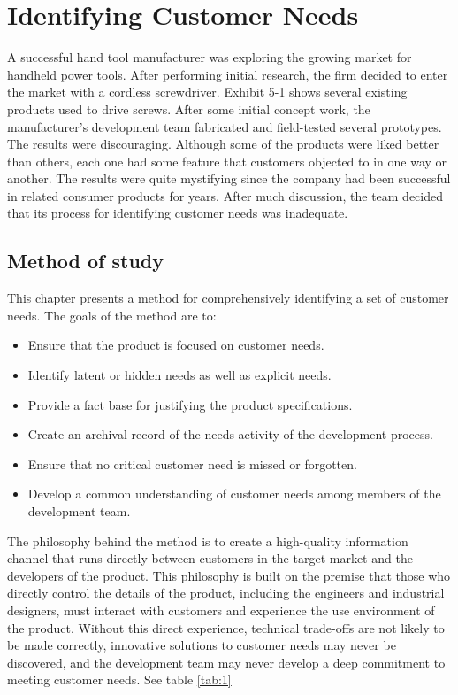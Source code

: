 
\chapter{Identifying Customer Needs}

A successful hand tool manufacturer was exploring the growing market for handheld power tools. After performing initial research, the firm decided to enter the market with a cordless screwdriver. Exhibit 5-1 shows several existing products used to drive screws. After some initial concept work, the manufacturer's development team fabricated and field-tested several prototypes. The results were discouraging. Although some of the products were liked better than others, each one had some feature that customers objected to in one way or another. The results were quite mystifying since the company had been successful in related consumer products for years. After much discussion, the team decided that its process for identifying customer needs was inadequate.

\section{Method of study}

This chapter presents a method for comprehensively identifying a set of customer needs. The goals of the method are to:
\begin{itemize}
  \item Ensure that the product is focused on customer needs.
  \item Identify latent or hidden needs as well as explicit needs.
  \item Provide a fact base for justifying the product specifications.
  \item Create an archival record of the needs activity of the development process.
  \item Ensure that no critical customer need is missed or forgotten.
  \item Develop  a  common  understanding  of  customer  needs  among  members  of  the development team.
\end{itemize}
The philosophy behind the method is to create a high-quality information channel that runs directly between customers in the target market and the developers of the product. This philosophy is built on the premise that those who directly control the details of the product, including  the  engineers  and  industrial  designers,  must  interact  with customers  and experience the use environment of the product. Without this direct experience, technical trade-offs are not likely to be made correctly, innovative solutions to customer needs may never be discovered, and the development team may never develop a deep commitment to meeting customer needs. See table \ref{tab:1}

